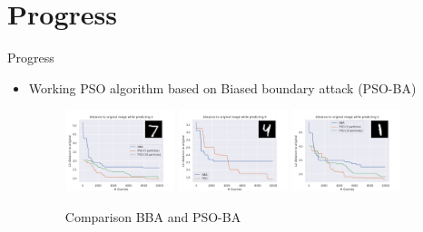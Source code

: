 \documentclass[11pt,t]{beamer}
\begin{document}
\section{Progress}
\begin{frame}{Progress}
\begin{itemize}
	\item Working PSO algorithm based on Biased boundary attack (PSO-BA)
	\begin{figure}
	\centering
	\includegraphics[width=0.30\textwidth]{graphics/comparison_1_3.png}
	\includegraphics[width=0.30\textwidth]{graphics/comparison_42_9.png}
	\includegraphics[width=0.30\textwidth]{graphics/comparison_1302_3.png}
	\caption{Comparison BBA and PSO-BA\label{fig:comparisons}}
	\footnotesize
	\flushleft
	\end{figure}
\end{itemize}
\end{frame}
\end{document}
